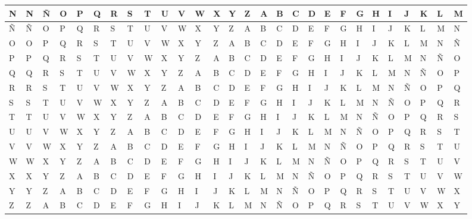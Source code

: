 \documentclass[spanish, mexico]{beamer}
\begin{document}
\begin{frame}
\begin{table}[]
{\begin{tabular}{| l | l | l | l | l | l | l | l | l | l | l | l | l | l | l | l | l | l | l | l | l | l | l | l | l | l | l | l |}
				\hline
				N & N & Ñ & O & P & Q & R & S & T & U & V & W & X & Y & Z & A & B & C & D & E & F & G & H & I & J & K & L & M\\
				\hline
				Ñ & Ñ & O & P & Q & R & S & T & U & V & W & X & Y & Z & A & B & C & D & E & F & G & H & I & J & K & L & M & N\\
				\hline
				O & O & P & Q & R & S & T & U & V & W & X & Y & Z & A & B & C & D & E & F & G & H & I & J & K & L & M & N & Ñ\\
				\hline
				P & P & Q & R & S & T & U & V & W & X & Y & Z & A & B & C & D & E & F & G & H & I & J & K & L & M & N & Ñ & O\\
				\hline
				Q & Q & R & S & T & U & V & W & X & Y & Z & A & B & C & D & E & F & G & H & I & J & K & L & M & N & Ñ & O & P\\
				\hline
				R & R & S & T & U & V & W & X & Y & Z & A & B & C & D & E & F & G & H & I & J & K & L & M & N & Ñ & O & P & Q\\
				\hline
				S & S & T & U & V & W & X & Y & Z & A & B & C & D & E & F & G & H & I & J & K & L & M & N & Ñ & O & P & Q & R\\
				\hline
				T & T & U & V & W & X & Y & Z & A & B & C & D & E & F & G & H & I & J & K & L & M & N & Ñ & O & P & Q & R & S\\
				\hline
				U & U & V & W & X & Y & Z & A & B & C & D & E & F & G & H & I & J & K & L & M & N & Ñ & O & P & Q & R & S & T\\
				\hline
				V & V & W & X & Y & Z & A & B & C & D & E & F & G & H & I & J & K & L & M & N & Ñ & O & P & Q & R & S & T & U\\
				\hline
				W & W & X & Y & Z & A & B & C & D & E & F & G & H & I & J & K & L & M & N & Ñ & O & P & Q & R & S & T & U & V\\
				\hline					
				X & X & Y & Z & A & B & C & D & E & F & G & H & I & J & K & L & M & N & Ñ & O & P & Q & R & S & T & U & V & W\\
				\hline					
				Y & Y & Z & A & B & C & D & E & F & G & H & I & J & K & L & M & N & Ñ & O & P & Q & R & S & T & U & V & W & X\\
				\hline					
				Z & Z & A & B & C & D & E & F & G & H & I & J & K & L & M & N & Ñ & O & P & Q & R & S & T & U & V & W & X & Y\\
				\hline										
			\end{tabular}%
		}
		\end{table}
	\end{frame}
\end{document}
